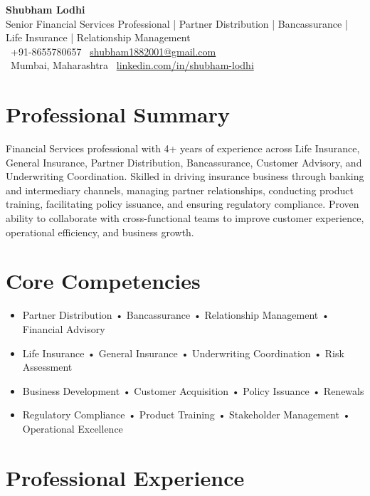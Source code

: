 \documentclass[11pt,a4paper]{article}
\begin{document}
\begin{center}
{\LARGE\textbf{Shubham Lodhi}}\\[3pt]
Senior Financial Services Professional | Partner Distribution | Bancassurance | Life Insurance | Relationship Management\\[5pt]
\faPhone\ +91-8655780657 \quad
\faEnvelope\ \href{mailto:shubham1882001@gmail.com}{shubham1882001@gmail.com}\\[3pt]
\faMapMarker*~Mumbai, Maharashtra \quad
\faLinkedin\ \href{https://www.linkedin.com/in/shubham-lodhi-76320712a/}{linkedin.com/in/shubham-lodhi}
\end{center}

\section*{Professional Summary}
Financial Services professional with 4+ years of experience across Life Insurance, General Insurance, Partner Distribution, Bancassurance, Customer Advisory, and Underwriting Coordination. Skilled in driving insurance business through banking and intermediary channels, managing partner relationships, conducting product training, facilitating policy issuance, and ensuring regulatory compliance. Proven ability to collaborate with cross-functional teams to improve customer experience, operational efficiency, and business growth.

\section*{Core Competencies}
\begin{itemize}[leftmargin=0.2in,itemsep=2pt]
\item Partner Distribution • Bancassurance • Relationship Management • Financial Advisory
\item Life Insurance • General Insurance • Underwriting Coordination • Risk Assessment
\item Business Development • Customer Acquisition • Policy Issuance • Renewals
\item Regulatory Compliance • Product Training • Stakeholder Management • Operational Excellence
\end{itemize}

\section*{Professional Experience}
\end{document}
